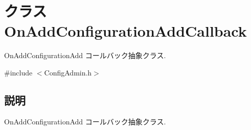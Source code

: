 \section{クラス OnAddConfigurationAddCallback}
\label{classOnAddConfigurationAddCallback}


OnAddConfigurationAdd コールバック抽象クラス.  




{\ttfamily \#include $<$ConfigAdmin.h$>$}



\subsection{説明}
OnAddConfigurationAdd コールバック抽象クラス. 